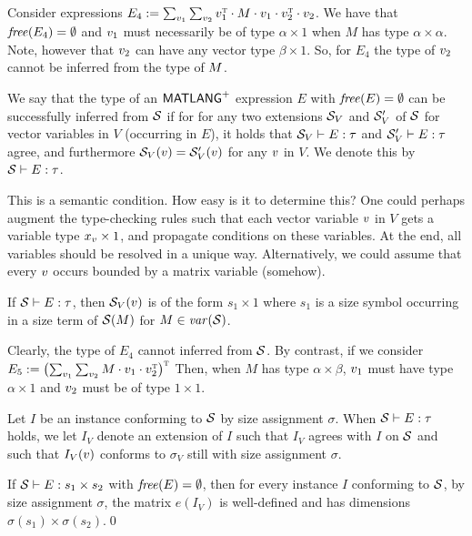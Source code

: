 \begin{example}
Consider expressions $E_4:=\sum_{v_1}\sum_{v_2} v_1^{\textsc{t}}\cdot M\cdot v_1\cdot v_2^{\textsc{t}}\cdot v_2$.
We have that $\operatorname{\mathit{free}}(E_4)=\emptyset$ and $v_1$ must necessarily be of type $\alpha\times 1$ when $M$ has type $\alpha\times \alpha$.
Note, however that $v_2$ can have any vector type $\beta\times 1$. So, for $E_4$ the type of $v_2$ cannot be inferred from 
the type of $M$.
\end{example}

We say that the type of an $\mathsf{MATLANG}^{\sf +}$ expression $E$ with $\operatorname{\mathit{free}}(E)=\emptyset$ can
be successfully inferred from $\mathcal{S}$ if for for any two extensions $\mathcal{S}_V$ and $\mathcal{S}_V'$ of $\mathcal{S}$
for vector variables in $V$ (occurring in $E$), it holds that $\mathcal{S}_V\vdash E:\tau$ and 
$\mathcal{S}_V'\vdash E:\tau$ agree, and furthermore $\mathcal{S}_V(v)=\mathcal{S}_V'(v)$ for any $v$ in $V$.
We denote this by $\mathcal{S}\vdash E:\tau$. 

\begin{todo} 
This is a semantic condition. How easy is it to determine this?
One could perhaps augment the type-checking rules such that each vector variable $v$ in $V$ gets a variable
type $x_v\times 1$, and propagate conditions on these variables. At  the end, all variables should be resolved
in a unique way. Alternatively, we could assume that every $v$ occurs bounded by a matrix variable (somehow).
\end{todo}


If $\mathcal{S}\vdash E:\tau$, then  $\mathcal{S}_V(v)$ is of the form $s_1\times 1$ where $s_1$ is a size
symbol occurring in a size term of $\mathcal{S}(M)$ for $M\in\operatorname{\mathit{var}}(\mathcal{S})$.

\begin{example}
Clearly, the type of $E_4$ cannot inferred from $\mathcal{S}$. By contrast, if we consider
$E_5:=\bigl(\sum_{v_1}\sum_{v_2} M\cdot v_1\cdot v_2^{\textsc{t}}\bigr)^{\textsc{t}}$
Then, when $M$ has type $\alpha\times \beta$, $v_1$ must have type $\alpha\times 1$ and
$v_2$ must be of type $1\times 1$.
\end{example}

Let $I$ be an instance conforming to $\mathcal{S}$
by size assignment $\sigma$. When  $\mathcal{S}\vdash E:\tau$ holds, we let
$I_V$ denote an extension of $I$ such that $I_V$ agrees with $I$ on $\mathcal{S}$ and such that
$I_V(v)$ conforms to $\sigma_V$ still with size assignment $\sigma$.



\begin{proposition}
If $\mathcal{S} \vdash E : s_1 \times s_2$ with $\operatorname{\mathit{free}}(E)=\emptyset$, then for every instance $I$
conforming to $\mathcal{S}$, by size assignment $\sigma$, the
matrix $e(I_V)$ is well-defined and has dimensions
$\sigma(s_1) \times \sigma(s_2)$.\qed
\end{proposition}

